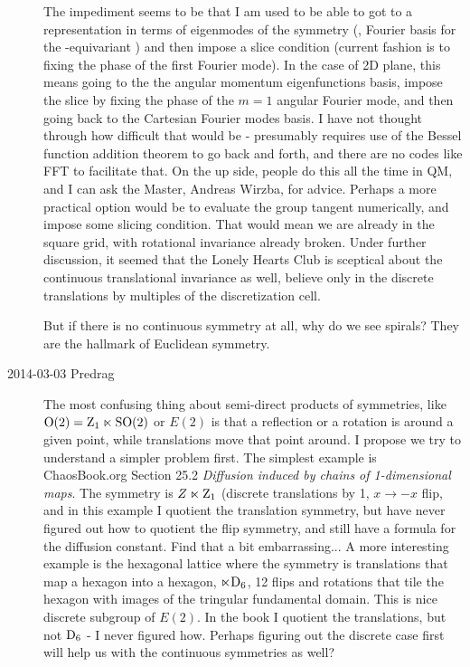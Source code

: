 \begin{description}
The impediment seems to be that I am used to be able to got to a
representation in terms of eigenmodes of the symmetry (\ie, Fourier basis
for the -equivariant \statesp) and then impose a slice condition
(current fashion is to fixing the phase of the first Fourier mode). In
the case of 2D plane, this means going to the the angular momentum
{eigenfunctions basis}, impose the slice by fixing the phase of the $m=1$
angular Fourier mode, and then going back to the Cartesian Fourier modes
basis. I have not thought through how difficult that would be -
presumably requires use of the Bessel function addition theorem to go
back and forth, and there are no codes like FFT to facilitate that. On
the up side, people do this all the time in QM, and I can ask the Master,
Andreas Wirzba, for advice. Perhaps a more practical option
would be to evaluate the group tangent numerically, and impose some
slicing condition. That would mean we are already in the square grid,
with rotational invariance already broken. Under further discussion, it
seemed that the Lonely Hearts Club is sceptical about the continuous
translational invariance as well, believe only in the discrete
translations by multiples of the discretization cell.

But if there is no continuous symmetry at all, why do we see spirals?
They are the hallmark of Euclidean symmetry.

\item[2014-03-03 Predrag] The most confusing thing about semi-direct
products of symmetries, like $\textrm{O}(2)=\textrm{Z}_{1}\ltimes\textrm{SO}(2)$ or $E(2)$ is
that a reflection or a rotation is around a given point, while
translations move that point around. I propose we try to understand a
simpler problem first. The simplest example is ChaosBook.org
 {Section
25.2} {\em Diffusion induced by chains of 1-dimensional maps}. The
symmetry is $Z\ltimes\textrm{Z}_{1}$ (discrete translations by 1, $x \to -x$
flip, and in this example I quotient the translation symmetry, but have
never figured out how to quotient the flip symmetry, and still have a
formula for the diffusion constant. Find that a bit embarrassing... A
more interesting example is the hexagonal lattice where the symmetry is
translations that map a hexagon into a hexagon, $\ltimes\textrm{D}_{6}$, 12 flips
and rotations that tile the hexagon with images of the tringular
fundamental domain. This is nice discrete subgroup of $E(2)$. In the book
I quotient the translations, but not $\textrm{D}_{6}$ - I never figured how.
Perhaps figuring out the discrete case first will help us with the
continuous symmetries as well?



\end{description}
